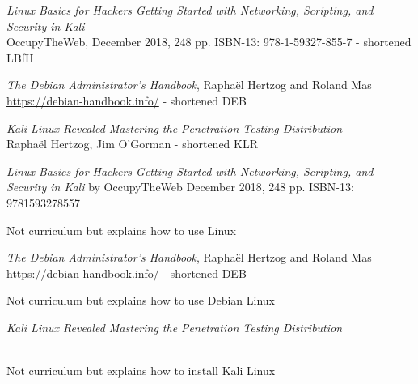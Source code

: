 \documentclass[Screen16to9,17pt]{foils}
\begin{document}


\begin{list2}
\item \emph{Linux Basics for Hackers Getting Started with Networking, Scripting, and Security in Kali}\\
OccupyTheWeb, December 2018, 248 pp. ISBN-13: 978-1-59327-855-7 - shortened LBfH
\item \emph{The Debian Administrator’s Handbook}, Raphaël Hertzog and Roland Mas\\
\url{https://debian-handbook.info/} - shortened DEB
\item \emph{Kali Linux Revealed  Mastering the Penetration Testing Distribution}\\
Raphaël Hertzog, Jim O'Gorman - shortened KLR
\end{list2}





\emph{Linux Basics for Hackers
Getting Started with Networking, Scripting, and Security in Kali}
by OccupyTheWeb
December 2018, 248 pp.
ISBN-13:
9781593278557

Not curriculum but explains how to use Linux



\emph{The Debian Administrator’s Handbook}, Raphaël Hertzog and Roland Mas\\
\url{https://debian-handbook.info/} - shortened DEB

Not curriculum but explains how to use Debian Linux



\emph{Kali Linux Revealed  Mastering the Penetration Testing Distribution}

\\
Not curriculum but explains how to install Kali Linux





\end{document}
